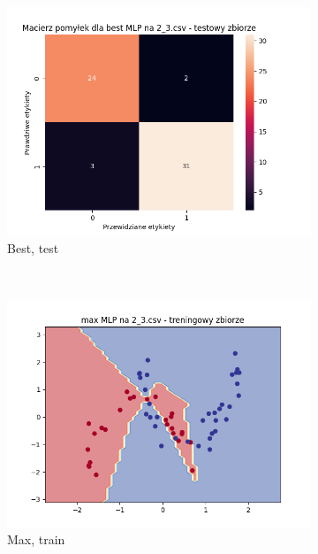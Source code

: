 \documentclass[12pt]{article}
\newcommand*{\subfigwidth}{0.24\textwidth}
\begin{document}
\begin{figure}[H]
\begin{subfigure}[t]{\subfigwidth}
        \includegraphics[width=\linewidth]{img/exp_3/mlp/2_3/best/test_matrix.png}
        \caption{Best, test}
    \end{subfigure}
    \\
    \begin{subfigure}[t]{\subfigwidth}
        \includegraphics[width=\linewidth]{img/exp_3/mlp/2_3/max/train_boundary.png}
        \caption{Max, train}
    \end{subfigure}
    \hfill
    \begin{subfigure}[t]{\subfigwidth}

\end{subfigure}
\end{figure}
\end{document}
